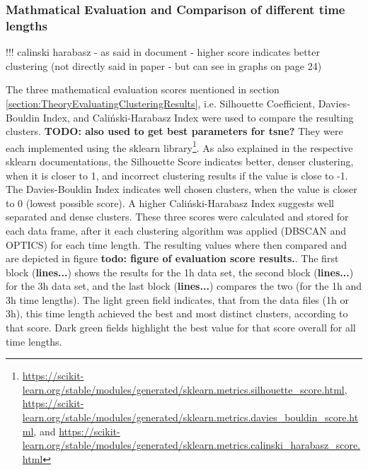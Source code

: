 \subsubsection{Mathmatical Evaluation and Comparison of different time lengths}
!!! calinski harabasz - as said in document - higher score indicates better clustering (not directly said in paper - but can see in graphs on page 24)

The three mathematical evaluation scores mentioned in section \ref{section:TheoryEvaluatingClusteringResults}, i.e. Silhouette Coefficient, Davies-Bouldin Index, and Caliński-Harabasz Index were used to compare the resulting clusters. \textbf{TODO: also used to get best parameters for tsne?} They were each implemented using the sklearn library\footnote{\url{https://scikit-learn.org/stable/modules/generated/sklearn.metrics.silhouette_score.html}, \url{https://scikit-learn.org/stable/modules/generated/sklearn.metrics.davies_bouldin_score.html}, and \url{https://scikit-learn.org/stable/modules/generated/sklearn.metrics.calinski_harabasz_score.html}}.
As also explained in the respective sklearn documentations, the Silhouette Score indicates better, denser clustering, when it is closer to 1, and incorrect clustering results if the value is close to -1. The Davies-Bouldin Index indicates well chosen clusters, when the value is closer to 0 (lowest possible score). A higher Caliński-Harabasz Index suggests well separated and dense clusters.
These three scores were calculated and stored for each data frame, after it each clustering algorithm was applied (DBSCAN and OPTICS) for each time length. The resulting values where then compared and are depicted in figure \textbf{todo: figure of evaluation score results.}. The first block (\textbf{lines...}) shows the results for the 1h data set, the second block (\textbf{lines...}) for the 3h data set, and the last block (\textbf{lines...}) compares the two (for the 1h and 3h time lengths). The light green field indicates, that from the data files (1h or 3h), this time length achieved the best and most distinct clusters, according to that score. Dark green fields highlight the best value for that score overall for all time lengths.
